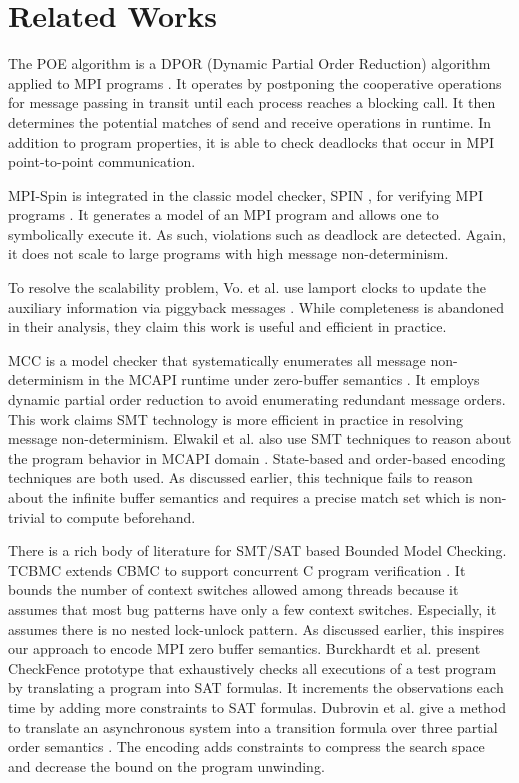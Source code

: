 \section{Related Works}
The POE algorithm is a DPOR (Dynamic Partial Order Reduction) algorithm \cite{DBLP:conf/popl/FlanaganG05} applied to MPI programs \cite{DBLP:conf/ppopp/VakkalankaSGK08}. It operates by postponing the cooperative operations for message passing in transit until each process reaches a blocking call. It then determines the potential matches of send and receive operations in runtime. In addition to program properties, it is able to check deadlocks that occur in MPI point-to-point communication.

MPI-Spin is integrated in the classic model checker, SPIN \cite{DBLP:journals/tse/Holzmann97}, for verifying MPI programs \cite{DBLP:conf/vmcai/Siegel07, siegel:2007:tutorial}. It generates a model of an MPI program and allows one to symbolically execute it. As such, violations such as deadlock are detected. Again, it does not scale to large programs with high message non-determinism.

To resolve the scalability problem, Vo. et al. use lamport clocks to update the auxiliary information via piggyback messages \cite{DBLP:conf/sc/VoAGSSB10, DBLP:conf/IEEEpact/VoGKSSB11}. While completeness is abandoned in their analysis, they claim this work is useful and efficient in practice. 

MCC is a model checker that systematically enumerates all message non-determinism in the MCAPI runtime under zero-buffer semantics \cite{DBLP:conf/fmcad/SharmaGMH09}. It employs dynamic partial order reduction to avoid enumerating redundant message orders. This work claims SMT technology is more efficient in practice in resolving message non-determinism. Elwakil et al. also use SMT techniques to reason about the program behavior in MCAPI domain \cite{DBLP:conf/issta/ElwakilY10, DBLP:conf/atva/ElwakilYW10}. State-based and order-based encoding techniques are both used. As discussed earlier, this technique fails to reason about the infinite buffer semantics and requires a precise match set which is non-trivial to compute beforehand.

There is a rich body of literature for SMT/SAT based Bounded Model Checking. 
TCBMC extends CBMC \cite{DBLP:conf/tacas/ClarkeKL04, DBLP:conf/dac/ClarkeKY03} to support concurrent C program verification \cite{DBLP:conf/cav/RabinovitzG05}. It bounds the number of context switches allowed among threads because it assumes that most bug patterns have only a few context switches. Especially, it assumes there is no nested lock-unlock pattern. As discussed earlier, this inspires our approach to encode MPI zero buffer semantics.
Burckhardt et al. present CheckFence prototype \cite{DBLP:conf/pldi/BurckhardtAM07} that exhaustively checks all executions of a test program by translating a program into SAT formulas. It increments the observations each time by adding more constraints to SAT formulas. 
Dubrovin et al. give a method to translate an asynchronous system into a transition formula over three partial order semantics \cite{DBLP:journals/scp/DubrovinJH12}. The encoding adds constraints to compress the search space and decrease the bound on the program unwinding.